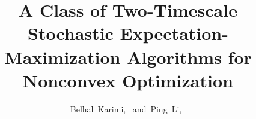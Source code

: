\documentclass[journal, 11pt]{IEEEtran}
\begin{document}
%
\title{A Class of Two-Timescale Stochastic Expectation-Maximization Algorithms for Nonconvex Optimization}
%
%
%

\author{Belhal~Karimi,~
        and~Ping~Li,~}%

% 
%
\end{document}
